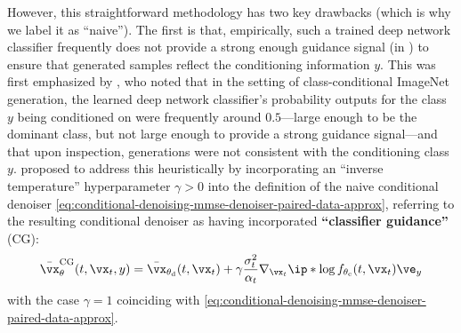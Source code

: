 \documentclass[../../book-main.tex]{subfiles}
\begin{document}
However, this straightforward methodology has two key drawbacks (which is why we
label it as ``naive''). The first is
that, empirically, such a trained deep network classifier frequently does not
provide a strong enough guidance signal (in
) to ensure that
generated samples reflect the conditioning information $y$. This was first
emphasized by \citet{Dhariwal2021-hg}, who noted that in the setting of
class-conditional ImageNet generation, the learned deep network
classifier's probability outputs for the class $y$ being conditioned on were
frequently around
$0.5$---large enough to be the dominant class, but not large enough to provide
a strong guidance signal---and that upon inspection, generations were not
consistent with the conditioning class $y$. \citet{Dhariwal2021-hg} proposed to
address this heuristically by incorporating an ``inverse temperature''
hyperparameter $\gamma > 0$
into the definition of the naive conditional denoiser
\eqref{eq:conditional-denoising-mmse-denoiser-paired-data-approx},
referring to the
resulting conditional denoiser as having incorporated \textbf{``classifier
guidance''}
(CG):
\begin{equation}\label{eq:conditional-denoising-mmse-denoiser-paired-data-approx-cg}
    \bar{\vx}_{\theta}^{\mathrm{CG}}(t, \vx_t, y)
    =
    \bar{\vx}_{\theta_{\mathrm{d}}}(t, \vx_t)
    + \gamma\frac{\sigma_t^2}{\alpha_t}
    \nabla_{\vx_t}
    \ip*{
        \log f_{\theta_{\mathrm{c}}}(t, \vx_t)
    }{
        \ve_{y}
    }
\end{equation}
with the case $\gamma = 1$ coinciding with
\eqref{eq:conditional-denoising-mmse-denoiser-paired-data-approx}.
\end{document}
